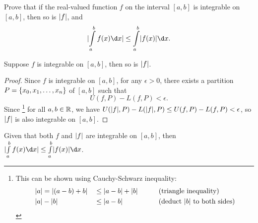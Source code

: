 \begin{problem}
  Prove that if the real-valued function $f$ on the interval $[a, b]$
  is integrable on $[a, b]$, then so is $\lvert f\rvert$, and
  \[
    \abs{\int\limits_a^b f(x) \d x} \leq \int\limits_a^b \abs{f(x)} \d x.
  \]
\end{problem}

\begin{answer}
  \begin{claim}
    Suppose $f$ is integrable on $[a, b]$, then so is $\lvert f\rvert$.
    \begin{proof}
      Since $f$ is integrable on $[a, b]$, for any $\epsilon > 0$,
      there exists a partition $P = \left\{x_0, x_1, \ldots, x_n\right\}$ of $[a, b]$
      such that
      \[ U(f, P) - L(f, P) < \epsilon. \]
      Since \footnote{
        This can be shown using Cauchy-Schwarz inequality:
        \begin{alignat*}{5}
          &\lvert a\rvert = \lvert(a - b) + b\rvert &&\leq \lvert a - b\rvert + \lvert b\rvert
            &&\qquad \text{(triangle inequality)}\\
          &\lvert a\rvert - \lvert b\rvert &&\leq \lvert a - b\rvert &&\qquad \text{(deduct $\lvert b\rvert$ to both sides)}
        \end{alignat*}
      }
      for all $a, b \in \mathbb{R}$, we have
      $U(\lvert f\rvert, P) - L(\lvert f\rvert, P) \leq U(f, P) - L(f, P) < \epsilon$,
      so $\lvert f\rvert$ is also integrable on $[a, b]$.
    \end{proof}
  \end{claim}

  \begin{claim}
    Given that both $f$ and $\lvert f\rvert$ are integrable on $[a, b]$,
    then $\abs{\int\limits_a^b f(x) \d x} \leq \int\limits_a^b \abs{f(x)} \d x$.
    

\end{claim}
\end{answer}
